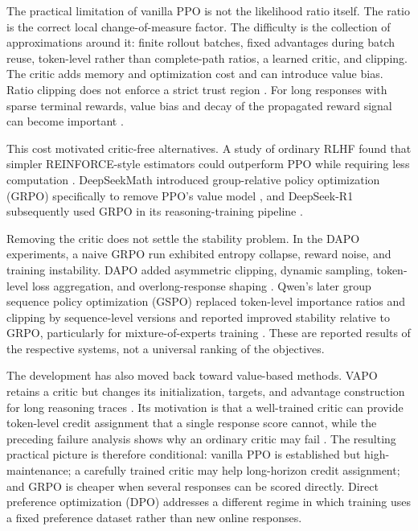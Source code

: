 \documentclass[11pt]{article}
\begin{document}
The practical limitation of vanilla PPO is not the likelihood ratio itself.
The ratio is the correct local change-of-measure factor.  The difficulty is
the collection of approximations around it: finite rollout batches, fixed
advantages during batch reuse, token-level rather than complete-path ratios,
a learned critic, and clipping.  The critic adds memory and optimization cost
and can introduce value bias.  Ratio clipping does not enforce a strict trust
region \cite{wang2020trulyppo}.  For long responses with sparse terminal
rewards, value bias and decay of the propagated reward signal can become
important \cite{yuan2025ppocollapse}.

This cost motivated critic-free alternatives.  A study of ordinary RLHF found
that simpler REINFORCE-style estimators could outperform PPO while requiring
less computation \cite{ahmadian2024backtobasics}.  DeepSeekMath introduced
group-relative policy optimization (GRPO) specifically to remove PPO's value
model \cite{shao2024deepseekmath}, and DeepSeek-R1 subsequently used GRPO in
its reasoning-training pipeline
\cite{deepseekai2025r1}.

Removing the critic does not settle the stability problem.  In the DAPO
experiments, a naive GRPO run exhibited entropy collapse, reward noise, and
training instability.  DAPO added asymmetric clipping, dynamic sampling,
token-level loss aggregation, and overlong-response shaping
\cite{yu2025dapo}.  Qwen's later group sequence policy optimization (GSPO)
replaced token-level importance ratios and clipping by sequence-level versions
and reported improved stability relative to GRPO, particularly for
mixture-of-experts training \cite{zheng2025gspo}.  These are reported results
of the respective systems, not a universal ranking of the objectives.

The development has also moved back toward value-based methods.  VAPO retains
a critic but changes its initialization, targets, and advantage construction
for long reasoning traces \cite{yue2025vapo}.  Its motivation is that a
well-trained critic can provide token-level credit assignment that a single
response score cannot, while the preceding failure analysis shows why an
ordinary critic may fail \cite{yuan2025ppocollapse}.  The resulting practical
picture is therefore conditional: vanilla PPO is established but
high-maintenance; a carefully trained critic may help long-horizon credit
assignment; and GRPO is cheaper when several responses can be scored directly.
Direct preference optimization (DPO) addresses a different regime in which
training uses a fixed preference dataset rather than new online responses.
\end{document}
